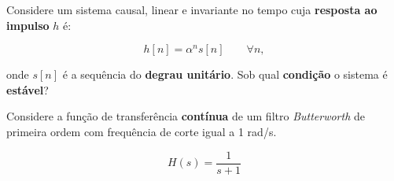 \documentclass{yagoexam}
\begin{document}
\begin{questions}
    
    \newpage
    
    \question[15]
    Considere um sistema causal, linear e invariante no tempo cuja \textbf{resposta ao impulso} $h$ é:
	
	$$h[n] = \alpha^ns[n] \qquad \forall n,$$
	
	onde $s[n]$ é a sequência do \textbf{degrau unitário}. Sob qual \textbf{condição} o sistema é \textbf{estável}?

    \newpage
    
    \question[15]
    Considere a função de transferência \textbf{contínua} de um filtro \textit{Butterworth} de primeira ordem com frequência de corte igual a 1 rad/s.
    
    $$H(s) = \dfrac{1}{s+1}$$
    
    \vspace{0.5cm}
    
    

\end{questions}
\end{document}
